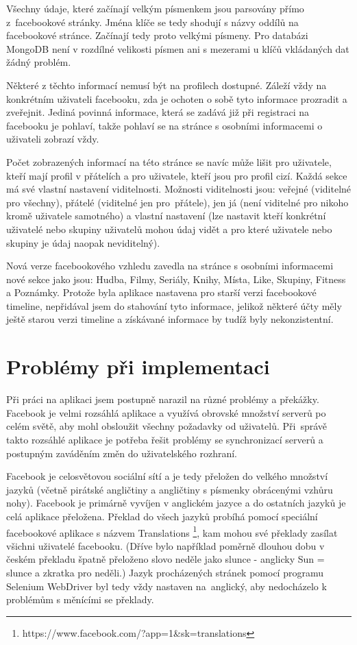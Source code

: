 \documentclass[thesis=M,czech]{FITthesis}[2013/05/10]
\begin{document}
Všechny údaje, které začínají velkým písmenkem jsou parsovány přímo z~facebookové stránky. Jména klíče se tedy shodují s názvy oddílů na facebookové stránce. Začínají tedy proto velkými písmeny. Pro databázi MongoDB není v rozdílné velikosti písmen ani s mezerami u klíčů vkládaných dat žádný problém.

Některé z těchto informací nemusí být na profilech dostupné. Záleží vždy na konkrétním uživateli facebooku, zda je ochoten o sobě tyto informace prozradit a zveřejnit. Jediná povinná informace, která se zadává již při registraci na facebooku je pohlaví, takže pohlaví se na stránce s osobními informacemi o uživateli zobrazí vždy. 

Počet zobrazených informací na této stránce se navíc může lišit pro uživatele, kteří mají profil v přátelích a pro uživatele, kteří jsou pro profil cizí. Každá sekce má své vlastní nastavení viditelnosti. Možnosti viditelnosti jsou: veřejné (viditelné pro všechny), přátelé (viditelné jen pro~přátele), jen já (není viditelné pro nikoho kromě uživatele samotného) a vlastní nastavení (lze nastavit kteří konkrétní uživatelé nebo skupiny uživatelů mohou údaj vidět a pro které uživatele nebo skupiny je údaj naopak neviditelný).

Nová verze facebookového vzhledu zavedla na stránce s osobními informacemi nové sekce jako jsou: Hudba, Filmy, Seriály, Knihy, Místa, Like, Skupiny, Fitness a Poznámky. Protože byla aplikace nastavena pro starší verzi facebookové timeline, nepřidával jsem do stahování tyto informace, jelikož některé účty měly ještě starou verzi timeline a získávané informace by tudíž byly nekonzistentní.



\section{Problémy při implementaci}

Při práci na aplikaci jsem postupně narazil na různé problémy a překážky. Facebook je velmi rozsáhlá aplikace a využívá obrovské množství serverů po celém světě, aby mohl obsloužit všechny požadavky od uživatelů. Při~správě takto rozsáhlé aplikace je potřeba řešit problémy se synchronizací serverů a postupným zaváděním změn do uživatelského rozhraní.

Facebook je celosvětovou sociální sítí a je tedy přeložen do velkého množství jazyků (včetně pirátské angličtiny a angličtiny s písmenky obrácenými vzhůru nohy). Facebook je primárně vyvíjen v anglickém jazyce a do ostatních jazyků je celá aplikace přeložena. Překlad do všech jazyků probíhá pomocí speciální facebookové aplikace s názvem Translations \footnote{https://www.facebook.com/?app=1\&sk=translations}, kam mohou své překlady zasílat všichni uživatelé facebooku. (Dříve bylo například poměrně dlouhou dobu v českém překladu špatně přeloženo slovo neděle jako slunce - anglicky Sun = slunce a zkratka pro neděli.) Jazyk procházených stránek pomocí programu Selenium WebDriver byl tedy vždy nastaven na~anglický, aby nedocházelo k problémům s měnícími se překlady. 
\end{document}
